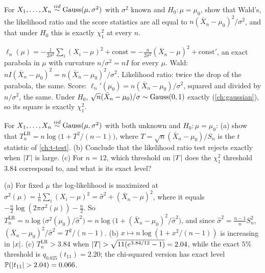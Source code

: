 \begin{exercise}
\label{ex:wlr-gauss-known}
For $X_1, \ldots, X_n \stackrel{iid}{\sim} \text{Gauss}(\mu, \sigma^2)$ with $\sigma^2$ known and $H_0: \mu = \mu_0$, show that Wald's, the likelihood ratio and the score statistics are all equal to $n(\bar{X}_n - \mu_0)^2/\sigma^2$, and that under $H_0$ this is exactly $\chi^2_1$ at every $n$.
\end{exercise}
\begin{solution}
$\ell_n(\mu) = -\frac{1}{2\sigma^2}\sum_i(X_i - \mu)^2 + \text{const} = -\frac{n}{2\sigma^2}(\bar{X}_n - \mu)^2 + \text{const}'$, an exact parabola in $\mu$ with curvature $n/\sigma^2 = nI$ for every $\mu$. Wald: $nI(\bar{X}_n - \mu_0)^2 = n(\bar{X}_n - \mu_0)^2/\sigma^2$. Likelihood ratio: twice the drop of the parabola, the same. Score: $\ell_n'(\mu_0) = n(\bar{X}_n - \mu_0)/\sigma^2$, squared and divided by $n/\sigma^2$, the same. Under $H_0$, $\sqrt{n}(\bar{X}_n - \mu_0)/\sigma \sim \text{Gauss}(0, 1)$ exactly (\cref{ch:gaussian}), so its square is exactly $\chi^2_1$.
\end{solution}

\begin{exercise}
\label{ex:wlr-t}
For $X_1, \ldots, X_n \stackrel{iid}{\sim} \text{Gauss}(\mu, \sigma^2)$ with both unknown and $H_0: \mu = \mu_0$: (a) show that $T^{\mathrm{LR}}_n = n\log\big(1 + T^2/(n - 1)\big)$, where $T = \sqrt{n}(\bar{X}_n - \mu_0)/S_n$ is the $t$ statistic of \cref{ch:t-test}. (b) Conclude that the likelihood ratio test rejects exactly when $\lvert T\rvert$ is large. (c) For $n = 12$, which threshold on $\lvert T\rvert$ does the $\chi^2_1$ threshold $3.84$ correspond to, and what is its exact level?
\end{exercise}
\begin{solution}
(a) For fixed $\mu$ the log-likelihood is maximized at $\sigma^2(\mu) = \frac1n\sum_i(X_i - \mu)^2 = \hat{\sigma}^2 + (\bar{X}_n - \mu)^2$, where it equals $-\frac{n}{2}\log(2\pi\sigma^2(\mu)) - \frac{n}{2}$. So $T^{\mathrm{LR}}_n = n\log\big(\sigma^2(\mu_0)/\hat{\sigma}^2\big) = n\log\big(1 + (\bar{X}_n - \mu_0)^2/\hat{\sigma}^2\big)$, and since $\hat{\sigma}^2 = \frac{n-1}{n}S_n^2$, $(\bar{X}_n - \mu_0)^2/\hat{\sigma}^2 = T^2/(n - 1)$. (b) $x \mapsto n\log(1 + x^2/(n-1))$ is increasing in $\lvert x\rvert$. (c) $T^{\mathrm{LR}}_n > 3.84$ when $\lvert T\rvert > \sqrt{11(e^{3.84/12} - 1)} = 2.04$, while the exact $5\%$ threshold is $q_{0.025}(t_{11}) = 2.20$; the chi-squared version has exact level $\mathbb{P}(\lvert t_{11}\rvert > 2.04) = 0.066$.
\end{solution}

